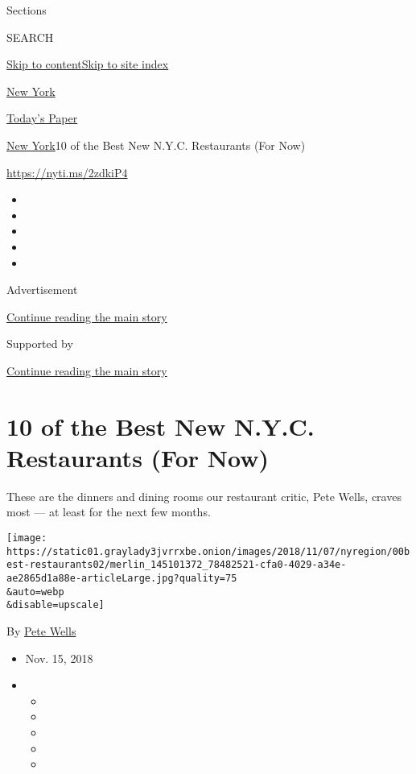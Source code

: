 Sections

SEARCH

\protect\hyperlink{site-content}{Skip to
content}\protect\hyperlink{site-index}{Skip to site index}

\href{https://www.nytimes3xbfgragh.onion/section/nyregion}{New York}

\href{https://myaccount.nytimes3xbfgragh.onion/auth/login?response_type=cookie\&client_id=vi}{}

\href{https://www.nytimes3xbfgragh.onion/section/todayspaper}{Today's
Paper}

\href{/section/nyregion}{New York}\textbar{}10 of the Best New N.Y.C.
Restaurants (For Now)

\url{https://nyti.ms/2zdkiP4}

\begin{itemize}
\item
\item
\item
\item
\item
\end{itemize}

Advertisement

\protect\hyperlink{after-top}{Continue reading the main story}

Supported by

\protect\hyperlink{after-sponsor}{Continue reading the main story}

\hypertarget{10-of-the-best-new-nyc-restaurants-for-now}{%
\section{10 of the Best New N.Y.C. Restaurants (For
Now)}\label{10-of-the-best-new-nyc-restaurants-for-now}}

These are the dinners and dining rooms our restaurant critic, Pete
Wells, craves most --- at least for the next few months.

\texttt{[image: https://static01.graylady3jvrrxbe.onion/images/2018/11/07/nyregion/00best-restaurants02/merlin\_145101372\_78482521-cfa0-4029-a34e-ae2865d1a88e-articleLarge.jpg?quality=75\\\&auto=webp\\\&disable=upscale]}

By \href{https://www.nytimes3xbfgragh.onion/by/pete-wells}{Pete Wells}

\begin{itemize}
\item
  Nov. 15, 2018
\item
  \begin{itemize}
  \item
  \item
  \item
  \item
  \item
  \end{itemize}
\end{itemize}

